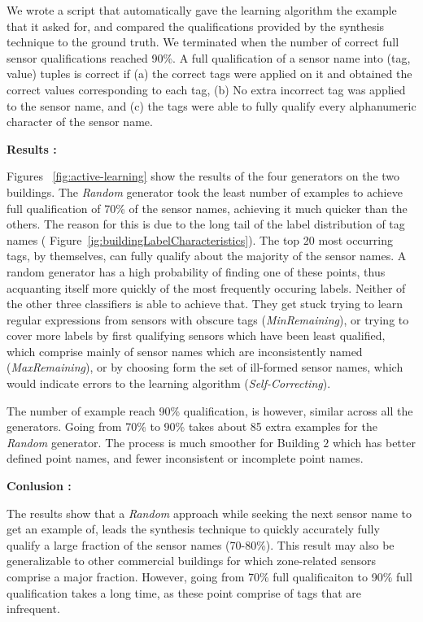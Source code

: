 We wrote a script that automatically gave the learning algorithm the example that it asked for, and compared the qualifications provided by the synthesis technique to the ground truth. We terminated when the number of correct full sensor qualifications reached 90\%. A full qualification of a sensor name into (tag, value) tuples is correct if (a) the correct tags were applied on it and  obtained the correct values corresponding to each tag, (b) No extra incorrect tag was applied to the sensor name, and (c) the tags were able to fully qualify every alphanumeric character of the sensor name.


{\bf Results : }

Figures ~\ref{fig:active-learning} show the results of the four generators on the two buildings. The \emph{Random} generator took the least number of examples to achieve full qualification of 70\% of the sensor names, achieving it much quicker than the others. The reason for this is due to the long tail of the label distribution of tag names (  Figure~\ref{ig:buildingLabelCharacteristics}). The top 20 most occurring tags, by themselves, can fully qualify about the majority of the sensor names. A random generator has a high probability of finding one of these points, thus acquanting itself more quickly of the most frequently occuring labels. Neither of the other three classifiers is able to achieve that. They get stuck trying to learn regular expressions from sensors with obscure tags (\emph{MinRemaining}), or trying to cover more labels by first qualifying sensors which have been least qualified, which comprise mainly of sensor names which are inconsistently named (\emph{MaxRemaining}), or by choosing form the set of ill-formed sensor names, which would indicate errors to the learning algorithm (\emph{Self-Correcting}).

The number of example reach 90\% qualification, is however, similar across all the generators. Going from 70\% to 90\% takes about 85 extra examples for the {\it Random} generator. The process is much smoother for Building $2$ which has better defined point names, and fewer inconsistent or incomplete point names.

{\bf Conlusion :}

The results show that a {\it Random} approach while seeking the next sensor name to get an example of, leads the synthesis technique to quickly accurately fully qualify a large fraction of the sensor names (70-80\%). This result may also be generalizable to other commercial buildings for which zone-related sensors comprise a major fraction. However, going from 70\% full qualificaiton to 90\% full qualification takes a long time, as these point comprise of tags that are infrequent.

